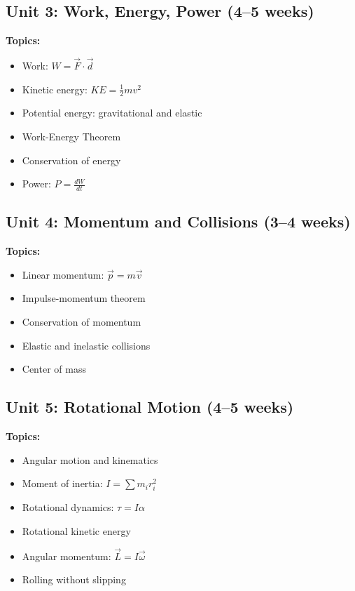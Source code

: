 \documentclass[12pt,oneside]{book}
\begin{document}
\subsection{Unit 3: Work, Energy, Power (4--5 weeks)}

\textbf{Topics:}
\begin{itemize}
    \item Work: $W = \vec{F} \cdot \vec{d}$
    \item Kinetic energy: $KE = \frac{1}{2}mv^2$
    \item Potential energy: gravitational and elastic
    \item Work-Energy Theorem
    \item Conservation of energy
    \item Power: $P = \frac{dW}{dt}$
\end{itemize}

\subsection{Unit 4: Momentum and Collisions (3--4 weeks)}

\textbf{Topics:}
\begin{itemize}
    \item Linear momentum: $\vec{p} = m\vec{v}$
    \item Impulse-momentum theorem
    \item Conservation of momentum
    \item Elastic and inelastic collisions
    \item Center of mass
\end{itemize}

\subsection{Unit 5: Rotational Motion (4--5 weeks)}

\textbf{Topics:}
\begin{itemize}
    \item Angular motion and kinematics
    \item Moment of inertia: $I = \sum m_i r_i^2$
    \item Rotational dynamics: $\tau = I\alpha$
    \item Rotational kinetic energy
    \item Angular momentum: $\vec{L} = I\vec{\omega}$
    \item Rolling without slipping
\end{itemize}
\end{document}
